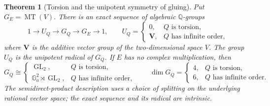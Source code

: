 \documentclass[11pt]{article}
\newtheorem{theorem}{Theorem}[section]
\theoremstyle{definition}
\theoremstyle{remark}
\newcommand{\Q}{\mathbb Q}
\begin{document}
\begin{theorem}[Torsion and the unipotent symmetry of gluing]
\label{thm:galois-attachment}
Put $G_E=\operatorname{MT}(V)$. There is an exact sequence of algebraic
$\Q$-groups
\[
 1\longrightarrow U_Q\longrightarrow G_Q\longrightarrow G_E
 \longrightarrow1,
 \qquad
 U_Q=
 \begin{cases}
  0,&Q\text{ is torsion},\\
  \mathbf V,&Q\text{ has infinite order},
 \end{cases}
\]
where $\mathbf V$ is the additive vector group of the two-dimensional
space $V$. The group $U_Q$ is the unipotent radical of $G_Q$.
If $E$ has no complex multiplication, then
\[
 G_Q\cong
 \begin{cases}
  \operatorname{GL}_2,&Q\text{ is torsion},\\
  \mathbb G_a^2\rtimes\operatorname{GL}_2,&Q\text{ has infinite order},
 \end{cases}
 \qquad
 \dim G_Q=
 \begin{cases}4,&Q\text{ is torsion},\\6,&Q\text{ has infinite order}.\end{cases}
\]
The semidirect-product description uses a choice of splitting on the
underlying rational vector space; the exact sequence and its radical
are intrinsic.
\end{theorem}
\end{document}
